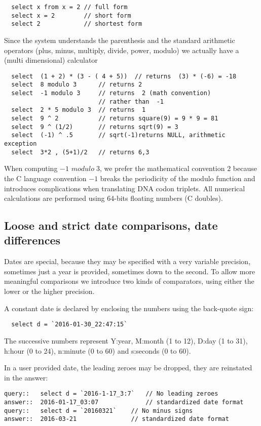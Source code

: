 \documentclass[11pt]{article}
\newcommand{\BL}{\begin{lstlisting}}
\begin{document}
\BL  
  select x from x = 2 // full form
  select x = 2        // short form
  select 2            // shortest form
\end{lstlisting}

Since the system understands the parenthesis and the  standard arithmetic operators
(plus, minus, multiply, divide, power, modulo) 
we actually have a (multi dimensional) calculator

\BL
  select  (1 + 2) * (3 - ( 4 + 5))  // returns  (3) * (-6) = -18
  select  8 modulo 3      // returns 2
  select  -1 modulo 3     // returns  2 (math convention) 
                          // rather than  -1
  select  2 * 5 modulo 3  // returns  1 
  select  9 ^ 2           // returns square(9) = 9 * 9 = 81
  select  9 ^ (1/2)       // returns sqrt(9) = 3
  select  (-1) ^ .5       // sqrt(-1)returns NULL, arithmetic exception
  select  3*2 , (5+1)/2   // returns 6,3
\end{lstlisting}

When computing $-1$ $modulo\; 3$, we prefer the mathematical convention $2$ 
because  the C language convention $-1$  breaks the periodicity of the modulo
function and introduces complications when translating DNA codon triplets.
All numerical calculations are performed using 64-bits floating numbers (C doubles).

\subsection{Loose and strict date comparisons, date differences}

Dates are special, because they may be specified with a very variable precision,
sometimes just a year is provided, sometimes down to the second.
To allow more meaningful comparisons we introduce two kinds of
comparators, using either the lower or the higher precision.

A constant date is declared by enclosing the numbers using the back-quote sign:
\BL
  select d = `2016-01-30_22:47:15`
\end{lstlisting}
The successive numbers represent Y:year, M:month (1 to 12), D:day (1 to 31), h:hour (0 to 24), n:minute (0 to 60) and s:seconds (0 to 60).

In a user provided date, the leading zeroes may be dropped, they are reinstated in the answer:
\BL
query::   select d = `2016-1-17_3:7`   // No leading zeroes
answer::  2016-01-17_03:07             // standardized date format
query::   select d = `20160321`    // No minus signs
answer::  2016-03-21               // standardized date format
\end{lstlisting}
\end{document}

